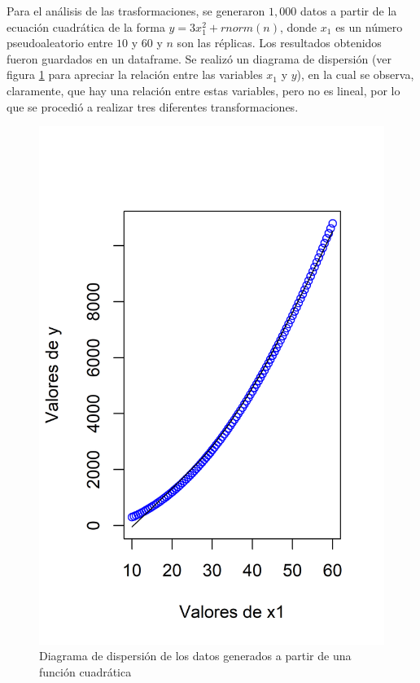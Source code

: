 \documentclass{article}
\begin{document}
Para el análisis de las trasformaciones, se generaron $1,000$ datos a partir de la ecuación cuadrática de la forma $y=3x_{1}^2 + rnorm(n)$, donde $x_{1}$ es un número pseudoaleatorio entre $10$ y $60$ y $n$ son las réplicas. Los resultados obtenidos fueron guardados en un dataframe. Se realizó un diagrama de dispersión (ver figura \ref{f3} para apreciar la relación entre las variables $x_{1}$ y $y$), en la cual se observa, claramente, que hay una relación entre estas variables, pero no es lineal, por lo que se procedió a realizar tres diferentes transformaciones.

\begin{figure}
\centering
\includegraphics[scale=0.9]{Figures/cuadratica.png}
\caption{Diagrama de dispersión de los datos generados a partir de una función cuadrática}
\label{f3}
\end{figure}
\end{document}
